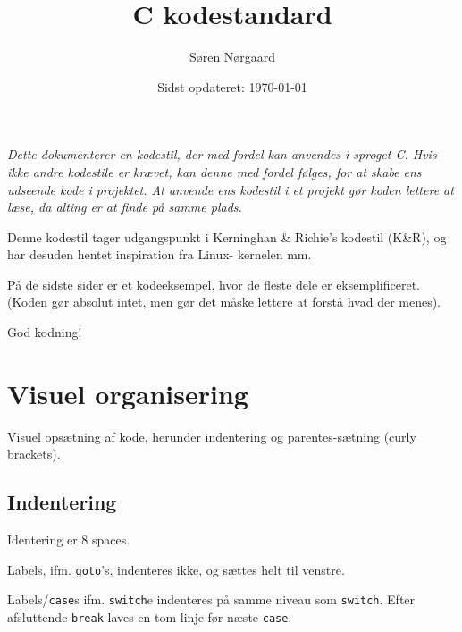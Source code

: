 \documentclass[article, 10pt]{memoir}
\title{C kodestandard}
\author{Søren Nørgaard}
\date{Sidst opdateret: \today}
\let\tempone\itemize
\let\temptwo\enditemize
\renewenvironment{itemize}{\tempone\firmlist}{\temptwo}
\begin{document}
\maketitle
\begin{multicols}{2}

    {
        \itshape
        Dette dokumenterer en kodestil, der med fordel kan anvendes i sproget C. Hvis ikke andre kodestile er krævet, kan denne med fordel følges, for at skabe ens udseende kode i projektet. At anvende ens kodestil i et projekt gør koden lettere at læse, da alting er at finde på samme plads.

        Denne kodestil tager udgangspunkt i Kerninghan \& Richie's kodestil (K\&R), og har desuden hentet inspiration fra Linux- kernelen mm.

        På de sidste sider er et kodeeksempel, hvor de fleste dele er eksemplificeret. (Koden gør absolut intet, men gør det måske lettere at forstå hvad der menes).

        God kodning!
    }
    \tableofcontents

    \chapter{Visuel organisering}
    Visuel opsætning af kode, herunder indentering og parentes-sætning (curly brackets).

    \section{Indentering}
    \begin{itemize}
    \item Identering er 8 spaces.
    \item Labels, ifm. \texttt{goto}'s, indenteres ikke, og sættes helt til venstre.
    \item Labels/\texttt{case}s ifm. \texttt{switch}e indenteres på samme niveau som \texttt{switch}. Efter afsluttende \texttt{break} laves en tom linje før næste \texttt{case}.
    \end{itemize}


\end{multicols}
\end{document}
